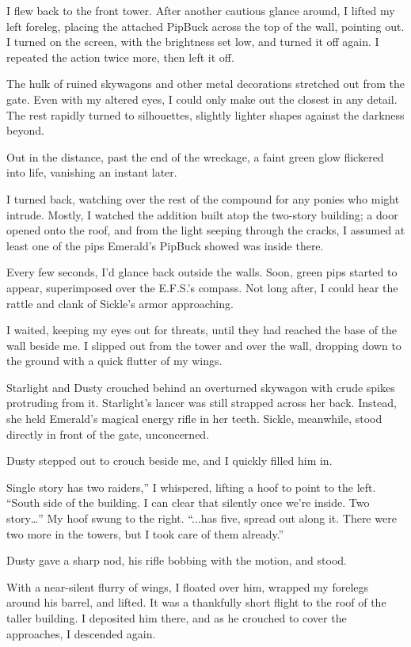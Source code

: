 I flew back to the front tower. After another cautious glance around, I lifted my left foreleg, placing the attached PipBuck across the top of the wall, pointing out. I turned on the screen, with the brightness set low, and turned it off again. I repeated the action twice more, then left it off.

The hulk of ruined skywagons and other metal decorations stretched out from the gate. Even with my altered eyes, I could only make out the closest in any detail. The rest rapidly turned to silhouettes, slightly lighter shapes against the darkness beyond.

Out in the distance, past the end of the wreckage, a faint green glow flickered into life, vanishing an instant later.

I turned back, watching over the rest of the compound for any ponies who might intrude. Mostly, I watched the addition built atop the two-story building; a door opened onto the roof, and from the light seeping through the cracks, I assumed at least one of the pips Emerald’s PipBuck showed was inside there.

Every few seconds, I’d glance back outside the walls. Soon, green pips started to appear, superimposed over the E.F.S.’s compass. Not long after, I could hear the rattle and clank of Sickle’s armor approaching.

I waited, keeping my eyes out for threats, until they had reached the base of the wall beside me. I slipped out from the tower and over the wall, dropping down to the ground with a quick flutter of my wings.

Starlight and Dusty crouched behind an overturned skywagon with crude spikes protruding from it. Starlight’s lancer was still strapped across her back. Instead, she held Emerald’s magical energy rifle in her teeth. Sickle, meanwhile, stood directly in front of the gate, unconcerned.

Dusty stepped out to crouch beside me, and I quickly filled him in.

\leavevmode{}Single story has two raiders,” I whispered, lifting a hoof to point to the left. “South side of the building. I can clear that silently once we’re inside. Two story…” My hoof swung to the right. “...has five, spread out along it. There were two more in the towers, but I took care of them already.”

Dusty gave a sharp nod, his rifle bobbing with the motion, and stood.

With a near-silent flurry of wings, I floated over him, wrapped my forelegs around his barrel, and lifted. It was a thankfully short flight to the roof of the taller building. I deposited him there, and as he crouched to cover the approaches, I descended again.


